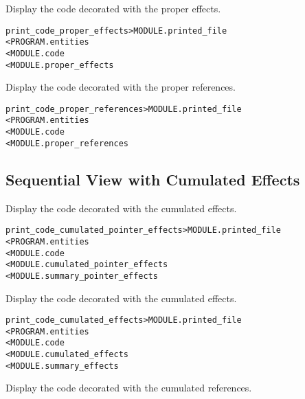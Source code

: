 \documentclass[a4paper]{report}
\newenvironment{PipsMake}{\begin{alltt}}{\end{alltt}}
\newenvironment{PipsPass}[1]{\label{pass:#1}}{}
\begin{document}
\begin{PipsPass}{print_code_proper_effects}
Display the code decorated with the proper effects.
\end{PipsPass}

\begin{PipsMake}
print_code_proper_effects       > MODULE.printed_file
        < PROGRAM.entities
        < MODULE.code
        < MODULE.proper_effects
\end{PipsMake}

\begin{PipsPass}{print_code_proper_references}
Display the code decorated with the proper references.
\end{PipsPass}

\begin{PipsMake}
print_code_proper_references       > MODULE.printed_file
        < PROGRAM.entities
        < MODULE.code
        < MODULE.proper_references
\end{PipsMake}

\subsection{Sequential View with Cumulated Effects}

\begin{PipsPass}{print_code_cumulated_pointer_effects}
Display the code decorated with the cumulated effects.
\end{PipsPass}

\begin{PipsMake}
print_code_cumulated_pointer_effects    > MODULE.printed_file
        < PROGRAM.entities
        < MODULE.code
        < MODULE.cumulated_pointer_effects
        < MODULE.summary_pointer_effects
\end{PipsMake}

\begin{PipsPass}{print_code_cumulated_effects}
Display the code decorated with the cumulated effects.
\end{PipsPass}

\begin{PipsMake}
print_code_cumulated_effects    > MODULE.printed_file
        < PROGRAM.entities
        < MODULE.code
        < MODULE.cumulated_effects
        < MODULE.summary_effects
\end{PipsMake}

\begin{PipsPass}{print_code_cumulated_references}
Display the code decorated with the cumulated references.
\end{PipsPass}
\end{document}
